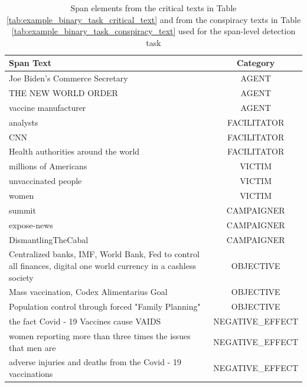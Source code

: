 \documentclass{Configuration_Files/PoliMi3i_thesis}
\begin{document}
\begin{table}[H]
    \centering
    \small
    \renewcommand{\arraystretch}{1.6} %
    \begin{tabular}{p{12cm}c}
        \hline
        \textbf{Span Text} & \textbf{Category} \\
        \hline
        Joe Biden's Commerce Secretary & AGENT \\
        THE NEW WORLD ORDER & AGENT \\
        vaccine manufacturer & AGENT \\
        \hline
        analysts & FACILITATOR \\
        CNN & FACILITATOR \\
        Health authorities around the world & FACILITATOR \\
        \hline
        millions of Americans & VICTIM \\
        unvaccinated people & VICTIM \\
        women & VICTIM \\
        \hline
        summit & CAMPAIGNER \\
        expose-news & CAMPAIGNER \\
        DismantlingTheCabal & CAMPAIGNER \\
        \hline
        Centralized banks, IMF, World Bank, Fed to control all finances, digital one world currency in a cashless society & OBJECTIVE \\
        Mass vaccination, Codex Alimentarius Goal & OBJECTIVE \\
        Population control through forced "Family Planning" & OBJECTIVE \\
        \hline
        the fact Covid - 19 Vaccines cause VAIDS & NEGATIVE\_EFFECT \\
        women reporting more than three times the issues that men are & NEGATIVE\_EFFECT \\
        adverse injuries and deaths from the Covid - 19 vaccinations & NEGATIVE\_EFFECT \\
        \hline
    \end{tabular}
    \caption{Span elements from the critical texts in Table \ref{tab:example_binary_task_critical_text} and from the conspiracy texts in Table \ref{tab:example_binary_task_conspiracy_text} used for the span-level detection task}
    \label{tab:example_span_text}
\end{table}
\FloatBarrier
\end{document}
